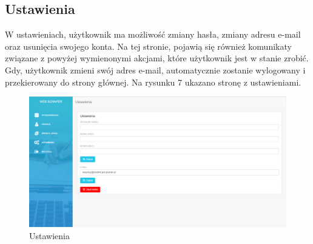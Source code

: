 \documentclass[12pt, titlepage]{article}
\begin{document}
	
	\newpage
	\subsection{Ustawienia}
	W ustawieniach, użytkownik ma możliwość zmiany hasła, zmiany adresu e-mail oraz usunięcia swojego konta. Na tej stronie, pojawią się również komunikaty związane z powyżej wymienonymi akcjami, które użytkownik jest w stanie zrobić. Gdy, użytkownik zmieni swój adres e-mail, automatycznie zostanie wylogowany i przekierowany do strony głównej. Na rysunku 7 ukazano stronę z ustawieniami.
	\begin{figure}[H]
		\centering
		\includegraphics[scale=0.45]{obrazki/ustawienia.png}
		\caption{Ustawienia}
		\label{fig:db_schema}
	\end{figure}
	
\end{document}

